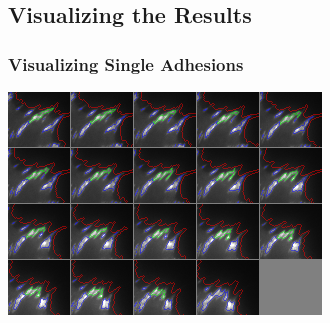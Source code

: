 \documentclass{beamer}
\begin{document}
%

\subsection{Visualizing the Results}

\begin{frame}
	\frametitle{Visualizing Single Adhesions}
	\begin{center}
	\includegraphics[height=0.75\textheight]{figures/finding/montage_00004}
	\end{center}
\end{frame}
\end{document}
